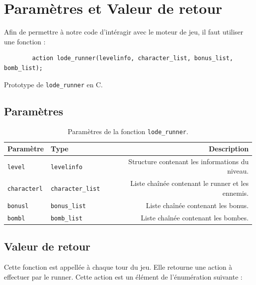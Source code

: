 \chapter{Paramètres et Valeur de retour}
\label{chap:Parametres}

Afin de permettre à notre code d'intéragir avec le moteur de jeu, il faut utiliser une fonction :

\begin{listing}[!htpb]
    \begin{verbatim}
        action lode_runner(levelinfo, character_list, bonus_list, bomb_list);
    \end{verbatim}
    \caption{Prototype de \texttt{lode\_runner} en C.}
    \label{listing:c-lode_runner-prototype-1}
\end{listing}

\section{Paramètres}

\begin{table}[!htpb]
    \label{tab:parameters-lode_runner-1}
    \begin{tabularx}{\textwidth}{lXr}
        \toprule
        \textbf{Paramètre} & \textbf{Type} & \textbf{Description} \\
        \midrule
        \texttt{level} & \texttt{levelinfo} & Structure contenant les informations du niveau. \\
        \texttt{characterl} & \texttt{character\_list} & Liste chaînée contenant le runner et les ennemis. \\
        \texttt{bonusl} & \texttt{bonus\_list} & Liste chaînée contenant les bonus. \\
        \texttt{bombl} & \texttt{bomb\_list} & Liste chaînée contenant les bombes. \\
        \bottomrule
    \end{tabularx}
    \caption{Paramètres de la fonction \texttt{lode\_runner}.}
\end{table}

\section{Valeur de retour}

Cette fonction est appellée à chaque tour du jeu. Elle retourne une action à effectuer par le runner.
Cette action est un élément de l'énumération suivante :

